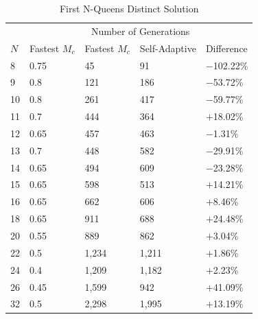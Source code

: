 \documentclass[conference]{IEEEtran}
\begin{document}
\begin{table}
\centering
\caption{First N-Queens Distinct Solution}
\begin{tabular}{|l|l|l|l|l|} \hline
&               &  \multicolumn{2}{c|}{Number of Generations}& \\ \cline{3-4}
$N$&    Fastest $M_{c}$&    Fastest $M_{c}$&   Self-Adaptive&    Difference\\ \hline
 8&     0.75&               45&                     91&                     $-$102.22\%\\ \hline
 9&     0.8&                121&                    186&                    $-$53.72\%\\ \hline
10&     0.8&                261&                    417&                    $-$59.77\%\\ \hline
11&     0.7&                444&                    364&                    $+$18.02\%\\ \hline
12&     0.65&               457&                    463&                    $-$1.31\%\\ \hline
13&     0.7&                448&                    582&                    $-$29.91\%\\ \hline
14&     0.65&               494&                    609&                    $-$23.28\%\\ \hline
15&     0.65&               598&                    513&                    $+$14.21\%\\ \hline
16&     0.65&               662&                    606&                    $+$8.46\%\\ \hline
18&     0.65&               911&                    688&                    $+$24.48\%\\ \hline
20&     0.55&               889&                    862&                    $+$3.04\%\\ \hline
22&     0.5&                1,234&                  1,211&                  $+$1.86\%\\ \hline
24&     0.4&                1,209&                  1,182&                  $+$2.23\%\\ \hline
26&     0.45&               1,599&                  942&                    $+$41.09\%\\ \hline
32&     0.5&                2,298&                  1,995&                  $+$13.19\%\\ \hline
\end{tabular}
\label{table:firstsol}
\end{table}
\end{document}

